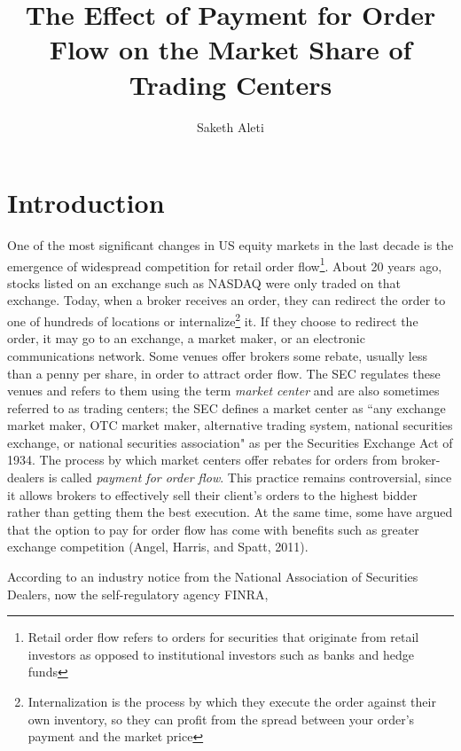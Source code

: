 \documentclass[12pt,a4paper]{article}
\begin{document}
	
\title{The Effect of Payment for Order Flow on the Market Share of Trading Centers}

\author{Saketh Aleti}

\maketitle

\section{Introduction}	
	
	
	One of the most significant changes in US equity markets in the last decade is the emergence of widespread competition for retail order flow\footnote{ Retail order flow refers to orders for securities that originate from retail investors as opposed to institutional investors such as banks and hedge funds}. About 20 years ago, stocks listed on an exchange such as NASDAQ were only traded on that exchange. Today, when a broker receives an order, they can redirect the order to one of hundreds of locations or internalize\footnote{ Internalization is the process by which they execute the order against their own inventory, so they can profit from the spread between your order's payment and the market price} it. If they choose to redirect the order, it may go to an exchange, a market maker, or an electronic communications network. Some venues offer brokers some rebate, usually less than a penny per share, in order to attract order flow. The SEC regulates these venues and refers to them using the term \textit{market center} and are also sometimes referred to as trading centers; the SEC defines a market center as ``any exchange market maker, OTC market maker, alternative trading system, national securities exchange, or national securities association" as per the Securities Exchange Act of 1934. The process by which market centers offer rebates for orders from broker-dealers is called \textit{payment for order flow}. This practice remains controversial, since it allows brokers to effectively sell their client's orders to the highest bidder rather than getting them the best execution. At the same time, some have argued that the option to pay for order flow has come with benefits such as greater exchange competition (Angel, Harris, and Spatt, 2011). 
	
	
	According to an industry notice from the National Association of Securities Dealers, now the self-regulatory agency FINRA,
	
\end{document}
